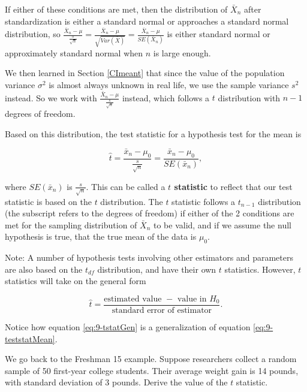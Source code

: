 \documentclass[
]{book}
\begin{document}
If either of these conditions are met, then the distribution of \(\bar{X}_n\) after standardization is either a standard normal or approaches a standard normal distribution, so \(\frac{\bar{X}_n - \mu}{\frac{\sigma}{\sqrt{n}}} = \frac{\bar{X}_n - \mu}{\sqrt{Var(\bar{X})}} = \frac{\bar{X}_n - \mu}{SE(\bar{X}_n)}\) is either standard normal or approximately standard normal when \(n\) is large enough.

We then learned in Section \ref{CImeant} that since the value of the population variance \(\sigma^2\) is almost always unknown in real life, we use the sample variance \(s^2\) instead. So we work with \(\frac{\bar{X}_n - \mu}{\frac{s}{\sqrt{n}}}\) instead, which follows a \(t\) distribution with \(n-1\) degrees of freedom.

Based on this distribution, the test statistic for a hypothesis test for the mean is

\begin{equation} 
\hat{t} =  \frac{\bar{x}_n - \mu_0}{\frac{s}{\sqrt{n}}} = \frac{\bar{x}_n - \mu_0}{SE(\bar{x}_n)},
\label{eq:9-teststatMean}
\end{equation}

where \(SE(\bar{x}_n)\) is \(\frac{s}{\sqrt{n}}\). This can be called a \textbf{\(t\) statistic} to reflect that our test statistic is based on the \(t\) distribution. The \(t\) statistic follows a \(t_{n-1}\) distribution (the subscript refers to the degrees of freedom) if either of the 2 conditions are met for the sampling distribution of \(\bar{X}_n\) to be valid, and if we assume the null hypothesis is true, that the true mean of the data is \(\mu_0\).

Note: A number of hypothesis tests involving other estimators and parameters are also based on the \(t_{df}\) distribution, and have their own \(t\) statistics. However, \(t\) statistics will take on the general form

\begin{equation} 
\hat{t} =  \frac{\text{estimated value }- \text{ value in } H_0}{\text{standard error of estimator}}.
\label{eq:9-tstatGen}
\end{equation}

Notice how equation \eqref{eq:9-tstatGen} is a generalization of equation \eqref{eq:9-teststatMean}.

We go back to the Freshman 15 example. Suppose researchers collect a random sample of 50 first-year college students. Their average weight gain is 14 pounds, with standard deviation of 3 pounds. Derive the value of the \(t\) statistic.
\end{document}
